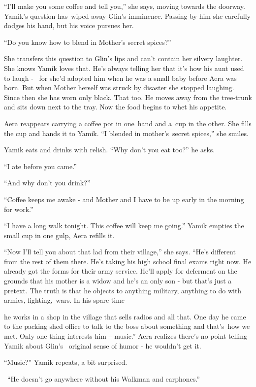 \documentclass[12pt]{book}
\begin{document}
{}``I'll make you some coffee and tell you,'' she says, moving towards the doorway. Yamik's question has~wiped away
Glin's {imminence}. Passing by him she carefully dodges his hand, but his voice pursues her.

{}``Do you know how to blend in Mother's secret spices?''

She transfers this question to Glin's lips and can't contain her silvery laughter. She knows Yamik loves that. He's
always telling her that it's how his aunt used to laugh - \ for she'd adopted him when he was a small baby before Aera
was born. But when Mother herself was struck by disaster she stopped laughing. Since then she has worn only black. That
too. He moves away from the tree-trunk and sits down next to the tray. Now the food begins to whet his appetite.

Aera reappears carrying a coffee pot in one~hand and a~cup in the other. She fills the cup and hands it to Yamik. ``I
blended in mother's~secret spices,'' she smiles.~

Yamik eats and drinks with relish. ``Why don't you eat too?'' he asks.

{}``I ate before you came.''

{}``And why don't you drink?''

{}``Coffee keeps me awake - and Mother and I have to be up early in the morning for work.''

{}``I have a long walk tonight. This coffee will keep me going.'' Yamik empties the small cup in one gulp, Aera refills
it.

{}``Now I'll tell you about that lad from their village,'' she says. ``He's different from the rest of them there. He's
taking his high school final exams right now. He already got the forms for their army service. He'll apply for
deferment on the grounds that his mother is a widow and he's an only son - but that's just a pretext. The truth is that
he objects to anything military, anything to do with armies, fighting,~wars. In his spare time

he works in a shop in the village that sells radios and all that. One day he came to the packing shed office to talk to
the boss about something and that's~how we met. Only one thing interests him -- music.'' Aera realizes there's no point
telling Yamik about Glin's {\ }original{ }sense of humor - he wouldn't get it.

{}``Music?'' Yamik repeats, a bit surprised.

~``He doesn't go anywhere without his Walkman and earphones.''
\end{document}
